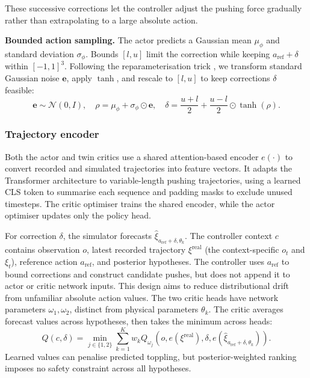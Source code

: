 \documentclass[12pt]{article}
\begin{document}
These successive corrections let the controller adjust the pushing force gradually rather than extrapolating to a large absolute action.

\textbf{Bounded action sampling.} The actor predicts a Gaussian mean $\mu_\phi$ and standard deviation $\sigma_\phi$. Bounds $[l,u]$ limit the correction while keeping $a_{\mathrm{ref}}+\delta$ within $[-1,1]^3$. Following the reparameterisation trick \cite{kingma2013}, we transform standard Gaussian noise $\mathbf e$, apply $\tanh$, and rescale to $[l,u]$ to keep corrections $\delta$ feasible:
\begin{equation}\label{eq:squash}
\mathbf e\sim\mathcal N(0,I),\quad \rho=\mu_\phi+\sigma_\phi\odot\mathbf e,\quad
\delta=\frac{u+l}{2}+\frac{u-l}{2}\odot\tanh(\rho).
\end{equation}

\subsubsection{Trajectory encoder}
Both the actor and twin critics use a shared attention-based encoder $e(\cdot)$ to convert recorded and simulated trajectories into feature vectors. It adapts the Transformer architecture \cite{transformer} to variable-length pushing trajectories, using a learned CLS token to summarise each sequence and padding masks to exclude unused timesteps. The critic optimiser trains the shared encoder, while the actor optimiser updates only the policy head.

For correction $\delta$, the simulator forecasts $\hat{\xi}_{a_{\mathrm{ref}}+\delta,\theta_k}$. The controller context $c$ contains observation $o$, latest recorded trajectory $\xi^{\mathrm{real}}$ (the context-specific $o_t$ and $\xi_t$), reference action $a_{\mathrm{ref}}$, and posterior hypotheses. The controller uses $a_{\mathrm{ref}}$ to bound corrections and construct candidate pushes, but does not append it to actor or critic network inputs. This design aims to reduce distributional drift from unfamiliar absolute action values. The two critic heads have network parameters $\omega_1,\omega_2$, distinct from physical parameters $\theta_k$. The critic averages forecast values across hypotheses, then takes the minimum across heads:
\begin{equation}
Q(c,\delta)=\min_{j\in\{1,2\}}\sum_{k=1}^{K}w_k
Q_{\omega_j}\!\left(o,e(\xi^{\mathrm{real}}),\delta,e(\hat{\xi}_{a_{\mathrm{ref}}+\delta,\theta_k})\right).
\label{eq:critic}\end{equation}
Learned values can penalise predicted toppling, but posterior-weighted ranking imposes no safety constraint across all hypotheses.
\end{document}
